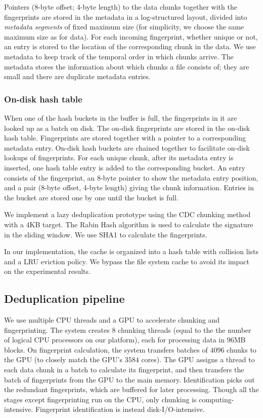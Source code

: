 \documentclass[prodmode,acmtecs]{acmsmall}
\begin{document}
Pointers (8-byte offset; 4-byte length) to the data chunks together with the fingerprints are stored in the metadata in a log-structured layout, divided into \emph{metadata segments} of fixed maximum size (for simplicity, we choose the same maximum size as for data).  For each incoming fingerprint, whether unique or not, an entry is stored to the location of the corresponding chunk in the data.  We use metadata to keep track of the temporal order in which chunks arrive. The metadata stores the information about which chunks a file consists of; they are small and there are duplicate metadata entries.

\subsubsection{On-disk hash table}

When one of the hash buckets in the buffer is full, the fingerprints in it are looked up as a batch on disk. The on-disk fingerprints are stored in the on-disk hash table.  Fingerprints are stored together with a pointer to a corresponding metadata entry.  On-disk hash buckets are chained together to facilitate on-disk lookups of fingerprints. For each unique chunk, after its metadata entry is inserted, one hash table entry is added to the corresponding bucket. An entry consists of the fingerprint, an 8-byte pointer to show the metadata entry position, and a pair (8-byte offset, 4-byte length) giving the chunk information. Entries in the bucket are stored one by one until the bucket is full.

We implement a lazy deduplication prototype using the CDC chunking method~\cite{policroniades2004alternatives} with a $4$KB target. The Rabin Hash algorithm is used to calculate the signature in the sliding window. We use SHA1 to calculate the fingerprints.


In our implementation, the cache is organized into a hash table with collision lists and a LRU eviction policy.  We bypass the file system cache to avoid its impact on the experimental results.


\subsection{Deduplication pipeline}

We use multiple CPU threads and a GPU to accelerate chunking and fingerprinting. The system creates $8$ chunking threads (equal to the the number of logical CPU processors on our platform), each for processing data in $96$MB blocks. On fingerprint calculation, the system transfers batches of $4096$ chunks to the GPU (to closely match the GPU's $3584$ cores). The GPU assigns a thread to each data chunk in a batch to calculate its fingerprint, and then transfers the batch of fingerprints from the GPU to the main memory.  Identification picks out the redundant fingerprints, which are buffered for later processing. Though all the stages except fingerprinting run on the CPU, only chunking is computing-intensive. Fingerprint identification is instead disk-I/O-intensive.
\end{document}
